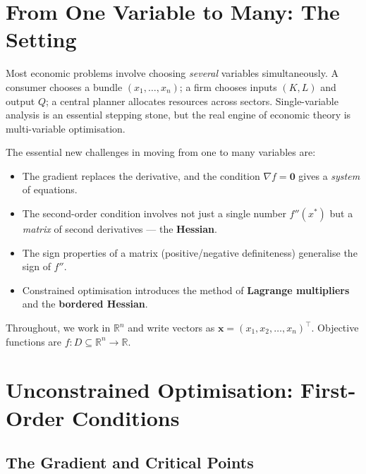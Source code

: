 \documentclass[12pt, a4paper]{article}
\theoremstyle{definition}
\newcommand{\R}{\mathbb{R}}
\newcommand{\bx}{\mathbf{x}}
\newcommand{\bz}{\mathbf{0}}
\begin{document}
\newpage
\tableofcontents
\newpage

\section{From One Variable to Many: The Setting}

Most economic problems involve choosing \emph{several} variables
simultaneously. A consumer chooses a bundle $(x_1,\ldots,x_n)$; a firm
chooses inputs $(K, L)$ and output $Q$; a central planner allocates resources
across sectors. Single-variable analysis is an essential stepping stone, but
the real engine of economic theory is multi-variable optimisation.

The essential new challenges in moving from one to many variables are:
\begin{itemize}
  \item The gradient replaces the derivative, and the condition $\nabla f = \bz$
        gives a \emph{system} of equations.
  \item The second-order condition involves not just a single number $f''(x^*)$
        but a \emph{matrix} of second derivatives --- the \textbf{Hessian}.
  \item The sign properties of a matrix (positive/negative definiteness)
        generalise the sign of $f''$.
  \item Constrained optimisation introduces the method of \textbf{Lagrange
        multipliers} and the \textbf{bordered Hessian}.
\end{itemize}

Throughout, we work in $\R^n$ and write vectors as
$\bx = (x_1, x_2, \ldots, x_n)^\top$. Objective functions are
$f: D \subseteq \R^n \to \R$.

\section{Unconstrained Optimisation: First-Order Conditions}

\subsection{The Gradient and Critical Points}
\end{document}
